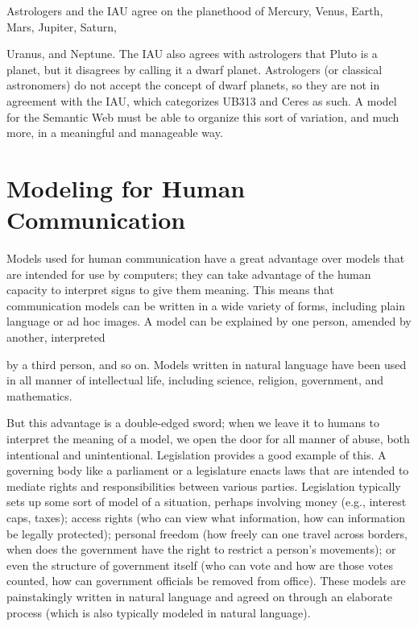 Astrologers and the IAU agree on the planethood of Mercury, Venus,
Earth, Mars, Jupiter, Saturn,

Uranus, and Neptune. The IAU also agrees with astrologers that Pluto is
a planet, but it disagrees by calling it a dwarf planet. Astrologers (or
classical astronomers) do not accept the concept of dwarf planets, so
they are not in agreement with the IAU, which categorizes UB313 and
Ceres as such. A model for the Semantic Web must be able to organize
this sort of variation, and much more, in a meaningful and manageable
way.

\section{Modeling for Human Communication}

Models used for human communication have a great advantage over models
that are intended for use by computers; they can take advantage of the
human capacity to interpret signs to give them meaning. This means that
communication models can be written in a wide variety of forms,
including plain language or ad hoc images. A model can be explained by
one person, amended by another, interpreted

by a third person, and so on. Models written in natural language have
been used in all manner of intellectual life, including science,
religion, government, and mathematics.

But this advantage is a double-edged sword; when we leave it to humans
to interpret the meaning of a model, we open the door for all manner of
abuse, both intentional and unintentional. Legislation provides a good
example of this. A governing body like a parliament or a legislature
enacts laws that are intended to mediate rights and responsibilities
between various parties. Legislation typically sets up some sort of
model of a situation, perhaps involving money (e.g., interest caps,
taxes); access rights (who can view what information, how can
information be legally protected); personal freedom (how freely can one
travel across borders, when does the government have the right to
restrict a person's movements); or even the structure of government
itself (who can vote and how are those votes counted, how can government
officials be removed from office). These models are painstakingly
written in natural language and agreed on through an elaborate process
(which is also typically modeled in natural language).

